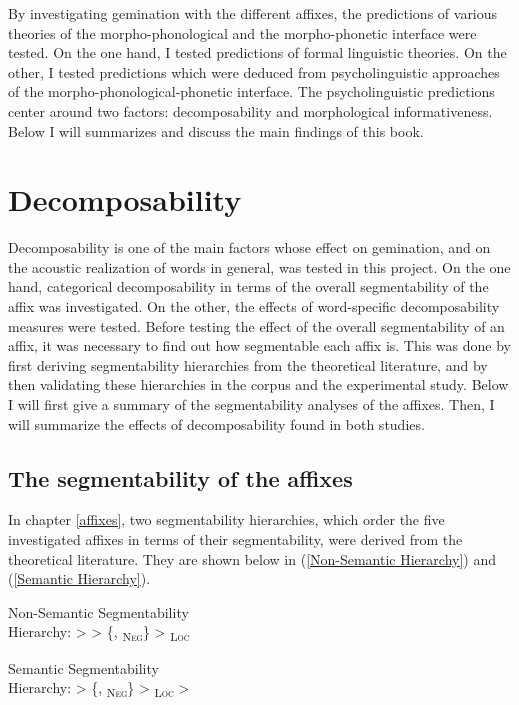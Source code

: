 By investigating gemination with the different affixes, the predictions of various theories of the morpho-phonological and the morpho-phonetic interface were tested. On the one hand, I tested predictions of formal linguistic theories. On the other, I tested predictions which were deduced from psycholinguistic approaches of the morpho-phonological-phonetic interface. The psycholinguistic predictions center around two factors: decomposability and morphological informativeness.  Below I will summarizes and discuss the main findings of this book.



\section{Decomposability}

Decomposability is one of the main factors whose effect on gemination, and on the acoustic realization of words in general, was tested in this project. On the one hand, categorical decomposability in terms of the overall segmentability of the affix was investigated. On the other, the effects of word-specific decomposability measures were tested. 
Before testing the effect of the overall segmentability of an affix, it was necessary to find out how segmentable each affix is. This was done by first deriving segmentability hierarchies from the theoretical literature, and by then validating these hierarchies  in the corpus and the experimental study. Below I will first give a summary of the segmentability analyses of the affixes. Then, I will summarize the effects of decomposability found in both studies.



\subsection{The segmentability of the affixes}

In chapter \ref{affixes}, two segmentability hierarchies, which order the five investigated affixes in terms of their segmentability, were derived from the theoretical literature. They are shown below in (\ref{Non-Semantic Hierarchy})  and (\ref{Semantic Hierarchy}). 


	\begin{exe}
		\ex \label{Non-Semantic Hierarchy} {Non-Semantic Segmentability }\\
		Hierarchy:\hspace*{3.5cm}   >  > \{, \textsubscript{\textsc{Neg}}\} >  \textsubscript{\textsc{Loc}}
		
				\ex \label{Semantic Hierarchy} 	{Semantic Segmentability }\\
				Hierarchy: \hspace*{3.5cm}  > \{, \textsubscript{\textsc{Neg}}\} >  \textsubscript{\textsc{Loc}} > 
	\end{exe}

